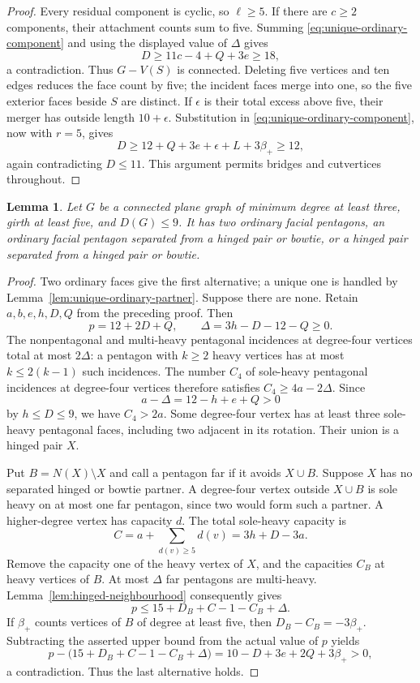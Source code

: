 \documentclass[11pt]{article}
\newtheorem{lemma}[theorem]{Lemma}
\theoremstyle{remark}
\numberwithin{equation}{section}
\numberwithin{table}{section}
\begin{document}
\begin{proof}
Every residual component is cyclic, so $\ell\ge5$. If there are
$c\ge2$ components, their attachment counts sum to five. Summing
\eqref{eq:unique-ordinary-component} and using the displayed value
of $\Delta$ gives
\[
 D\ge11c-4+Q+3e\ge18,
\]
a contradiction. Thus $G-V(S)$ is connected. Deleting five vertices
and ten edges reduces the face count by five; the incident faces merge
into one, so the five exterior faces beside $S$ are distinct. If
$\epsilon$ is their total excess above five, their merger has outside
length $10+\epsilon$. Substitution in
\eqref{eq:unique-ordinary-component}, now with $r=5$, gives
\[
 D\ge12+Q+3e+\epsilon+L+3\beta_+\ge12,
\]
again contradicting $D\le11$. This argument permits bridges and
cutvertices throughout.
\end{proof}

\begin{lemma}\label{lem:small-excess-structure}
Let $G$ be a connected plane graph of minimum degree at least three,
girth at least five, and $D(G)\le9$. It has two ordinary facial
pentagons, an ordinary facial pentagon separated from a hinged pair
or bowtie, or a hinged pair separated from a hinged pair or bowtie.
\end{lemma}
\begin{proof}
Two ordinary faces give the first alternative; a unique one is handled
by Lemma~\ref{lem:unique-ordinary-partner}. Suppose there are none.
Retain $a,b,e,h,D,Q$ from the preceding proof. Then
\[
 p=12+2D+Q,\qquad \Delta=3h-D-12-Q\ge0.
\]
The nonpentagonal and multi-heavy pentagonal incidences at degree-four
vertices total at most $2\Delta$: a pentagon with $k\ge2$ heavy
vertices has at most $k\le2(k-1)$ such incidences. The number $C_4$
of sole-heavy pentagonal incidences at degree-four vertices therefore
satisfies $C_4\ge4a-2\Delta$. Since
\[
 a-\Delta=12-h+e+Q>0
\]
by $h\le D\le9$, we have $C_4>2a$. Some degree-four vertex has at
least three sole-heavy pentagonal faces, including two adjacent in
its rotation. Their union is a hinged pair $X$.

Put $B=N(X)\setminus X$ and call a pentagon far if it avoids $X\cup B$.
Suppose $X$ has no separated hinged or bowtie partner. A degree-four
vertex outside $X\cup B$ is sole heavy on at most one far pentagon,
since two would form such a partner. A higher-degree vertex has
capacity $d$. The total sole-heavy capacity is
\[
 C=a+\sum_{d(v)\ge5}d(v)=3h+D-3a.
\]
Remove the capacity one of the heavy vertex of $X$, and the capacities
$C_B$ at heavy vertices of $B$. At most $\Delta$ far pentagons are
multi-heavy. Lemma~\ref{lem:hinged-neighbourhood} consequently gives
\[
 p\le15+D_B+C-1-C_B+\Delta.
\]
If $\beta_+$ counts vertices of $B$ of degree at least five, then
$D_B-C_B=-3\beta_+$. Subtracting the asserted upper bound from the
actual value of $p$ yields
\[
 p-\bigl(15+D_B+C-1-C_B+\Delta\bigr)
   =10-D+3e+2Q+3\beta_+>0,
\]
a contradiction. Thus the last alternative holds.
\end{proof}
\end{document}
